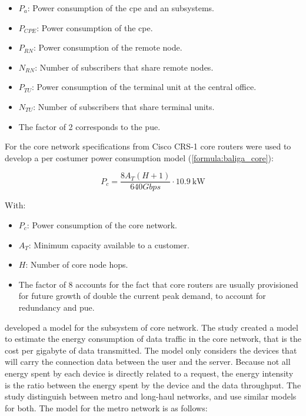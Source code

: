 \begin{itemize}
    \item $P_a$: Power consumption of the \ac{cpe} and \ac{an} subsystems.
    \item $P_{CPE}$: Power consumption of the \ac{cpe}.
    \item $P_{RN}$: Power consumption of the remote node.
    \item $N_{RN}$: Number of subscribers that share remote nodes.
    \item $P_{TU}$: Power consumption of the terminal unit at the central office.
    \item $N_{TU}$: Number of subscribers that share  terminal units.
    \item The factor of 2 corresponds to the \ac{pue}.  
\end{itemize}

For the core network specifications from Cisco CRS-1 core routers were used to develop a per costumer power consumption model (\ref{formula:baliga_core}):

\begin{equation}
\label{formula:baliga_core}
    P_c = \frac{8A_{T}(H + 1)}{640 Gbps} \cdot \SI{10.9}{\kilo\watt}
\end{equation}

With: 

\begin{itemize}
    \item $P_c$: Power consumption of the core network.
    \item $A_{T}$: Minimum capacity available to a customer.
    \item $H$: Number of core node hops.
    \item The factor of 8 accounts for the fact that core routers are usually provisioned for future growth of double the current peak demand, to account for redundancy and \ac{pue}.
\end{itemize}

 
\citet{Schien2015} developed a model for the subsystem of core network. The study created a model to estimate the energy consumption of data traffic in the core network, that is the cost per \ac{gigabyte} of data transmitted. 
The model only considers the devices that will carry the connection data between the user and the server. Because not all energy spent by each device is directly related to a request, the energy intensity is the ratio between the energy spent by the device and the data throughput. The study distinguish between metro and long-haul networks, and use similar models for both. The model for the metro network is as follows:

